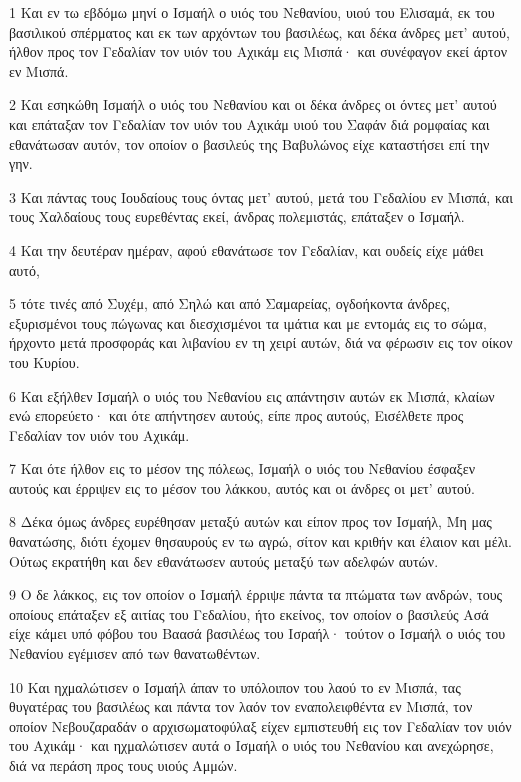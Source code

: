 \par 1 Και εν τω εβδόμω μηνί ο Ισμαήλ ο υιός του Νεθανίου, υιού του Ελισαμά, εκ του βασιλικού σπέρματος και εκ των αρχόντων του βασιλέως, και δέκα άνδρες μετ' αυτού, ήλθον προς τον Γεδαλίαν τον υιόν του Αχικάμ εις Μισπά· και συνέφαγον εκεί άρτον εν Μισπά.
\par 2 Και εσηκώθη Ισμαήλ ο υιός του Νεθανίου και οι δέκα άνδρες οι όντες μετ' αυτού και επάταξαν τον Γεδαλίαν τον υιόν του Αχικάμ υιού του Σαφάν διά ρομφαίας και εθανάτωσαν αυτόν, τον οποίον ο βασιλεύς της Βαβυλώνος είχε καταστήσει επί την γην.
\par 3 Και πάντας τους Ιουδαίους τους όντας μετ' αυτού, μετά του Γεδαλίου εν Μισπά, και τους Χαλδαίους τους ευρεθέντας εκεί, άνδρας πολεμιστάς, επάταξεν ο Ισμαήλ.
\par 4 Και την δευτέραν ημέραν, αφού εθανάτωσε τον Γεδαλίαν, και ουδείς είχε μάθει αυτό,
\par 5 τότε τινές από Συχέμ, από Σηλώ και από Σαμαρείας, ογδοήκοντα άνδρες, εξυρισμένοι τους πώγωνας και διεσχισμένοι τα ιμάτια και με εντομάς εις το σώμα, ήρχοντο μετά προσφοράς και λιβανίου εν τη χειρί αυτών, διά να φέρωσιν εις τον οίκον του Κυρίου.
\par 6 Και εξήλθεν Ισμαήλ ο υιός του Νεθανίου εις απάντησιν αυτών εκ Μισπά, κλαίων ενώ επορεύετο· και ότε απήντησεν αυτούς, είπε προς αυτούς, Εισέλθετε προς Γεδαλίαν τον υιόν του Αχικάμ.
\par 7 Και ότε ήλθον εις το μέσον της πόλεως, Ισμαήλ ο υιός του Νεθανίου έσφαξεν αυτούς και έρριψεν εις το μέσον του λάκκου, αυτός και οι άνδρες οι μετ' αυτού.
\par 8 Δέκα όμως άνδρες ευρέθησαν μεταξύ αυτών και είπον προς τον Ισμαήλ, Μη μας θανατώσης, διότι έχομεν θησαυρούς εν τω αγρώ, σίτον και κριθήν και έλαιον και μέλι. Ούτως εκρατήθη και δεν εθανάτωσεν αυτούς μεταξύ των αδελφών αυτών.
\par 9 Ο δε λάκκος, εις τον οποίον ο Ισμαήλ έρριψε πάντα τα πτώματα των ανδρών, τους οποίους επάταξεν εξ αιτίας του Γεδαλίου, ήτο εκείνος, τον οποίον ο βασιλεύς Ασά είχε κάμει υπό φόβου του Βαασά βασιλέως του Ισραήλ· τούτον ο Ισμαήλ ο υιός του Νεθανίου εγέμισεν από των θανατωθέντων.
\par 10 Και ηχμαλώτισεν ο Ισμαήλ άπαν το υπόλοιπον του λαού το εν Μισπά, τας θυγατέρας του βασιλέως και πάντα τον λαόν τον εναπολειφθέντα εν Μισπά, τον οποίον Νεβουζαραδάν ο αρχισωματοφύλαξ είχεν εμπιστευθή εις τον Γεδαλίαν τον υιόν του Αχικάμ· και ηχμαλώτισεν αυτά ο Ισμαήλ ο υιός του Νεθανίου και ανεχώρησε, διά να περάση προς τους υιούς Αμμών.
